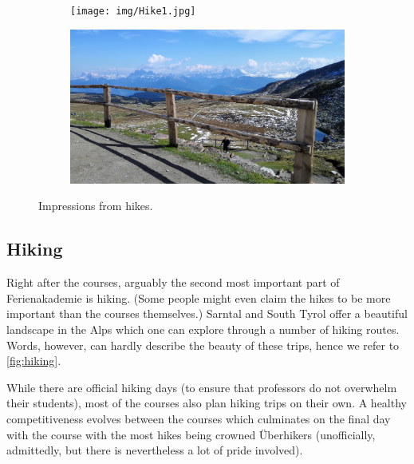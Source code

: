 \begin{figure}[ht]%
	\centering
    \begin{subfigure}[t]{0.5\textwidth}
 	\begin{center}%
 		\texttt{[image: img/Hike1.jpg]}%
 	\end{center}%
    \end{subfigure}%
    \begin{subfigure}[t]{0.5\textwidth}
 	\begin{center}%
 		\includegraphics[scale=0.05]{img/Hike2.jpg}%
 	\end{center}%
    \end{subfigure}
    \caption{Impressions from hikes.}
    \label{fig:hiking}
\end{figure}
\subsection{Hiking}
Right after the courses, arguably the second most important part of Ferienakademie is hiking. (Some people might even claim the hikes to be more important than the courses themselves.) Sarntal and South Tyrol offer a beautiful landscape in the Alps which one can explore through a number of hiking routes. Words, however, can hardly describe the beauty of these trips, hence we refer to \autoref{fig:hiking}. 

While there are official hiking days (to ensure that professors do not overwhelm their students), most of the courses also plan hiking trips on their own. A healthy competitiveness evolves between the courses which culminates on the final day with the course with the most hikes being crowned \"Uberhikers (unofficially, admittedly, but there is nevertheless a lot of pride involved).

